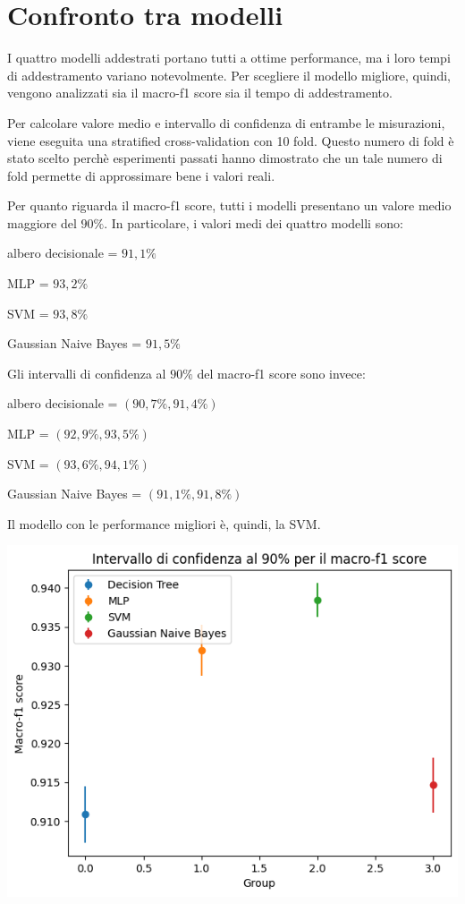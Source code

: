 \section{Confronto tra modelli}
I quattro modelli addestrati portano tutti a ottime performance, ma i loro 
tempi di addestramento variano notevolmente.
Per scegliere il modello migliore, quindi, vengono analizzati sia il macro-f1 score
sia il tempo di addestramento.

Per calcolare valore medio e intervallo di confidenza di entrambe
le misurazioni, viene eseguita
una stratified cross-validation con 10 fold. Questo numero di fold è stato 
scelto perchè esperimenti passati hanno dimostrato che un tale numero di fold
permette di approssimare bene i valori reali.

Per quanto riguarda il macro-f1 score, tutti i modelli presentano un
valore medio maggiore del $90\%$. In particolare, i valori medi dei quattro modelli
sono: \begin{itemize*}
    \item albero decisionale = $91,1\%$
    \item MLP = $93,2\%$
    \item SVM = $93,8\%$
    \item Gaussian Naive Bayes = $91,5\%$
\end{itemize*}
Gli intervalli di confidenza al $90\%$ del macro-f1 score sono invece:
\begin{itemize*}
    \item albero decisionale = $(90,7\%, 91,4\%)$
    \item MLP = $(92,9\%, 93,5\%)$
    \item SVM = $(93,6\%, 94,1\%)$
    \item Gaussian Naive Bayes = $(91,1\%, 91,8\%)$
\end{itemize*}
Il modello con le performance migliori è, quindi, la SVM.

\begin{Figure}
    \centering
    \includegraphics[width=\linewidth]{img/confidence_interval_perf.png}
\end{Figure}

